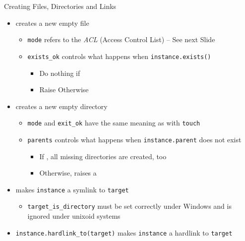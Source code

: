 \begin{frame}[fragile]{Creating Files, Directories and Links}
%
\begin{itemize}
\item {} creates a new empty file
	\begin{itemize}
	\item \texttt{mode} refers to the \emph{ACL} (Access Control List) -- See next Slide
	\item \texttt{exists\_ok} controls what happens when \texttt{instance.exists()}
		\begin{itemize}
		\item Do nothing if 
		\item Raise  Otherwise
		\end{itemize}
	\end{itemize}
\item {} creates a new empty directory
	\begin{itemize}
	\item \texttt{mode} and \texttt{exit\_ok} have the same meaning as with \texttt{touch}
	\item \texttt{parents} controls what happens when \texttt{instance.parent} does not exist
		\begin{itemize}
		\item If , all missing directories are created, too
		\item Otherwise, raises a 
		\end{itemize}
	\end{itemize}
\item {} makes \texttt{instance} a symlink to \texttt{target}
	\begin{itemize}
	\item \texttt{target\_is\_directory} must be set correctly under Windows and is ignored under unixoid systems
	\end{itemize}
\item \texttt{instance.hardlink\_to(target)} makes \texttt{instance} a hardlink to \texttt{target}
\end{itemize}
%
\end{frame}


